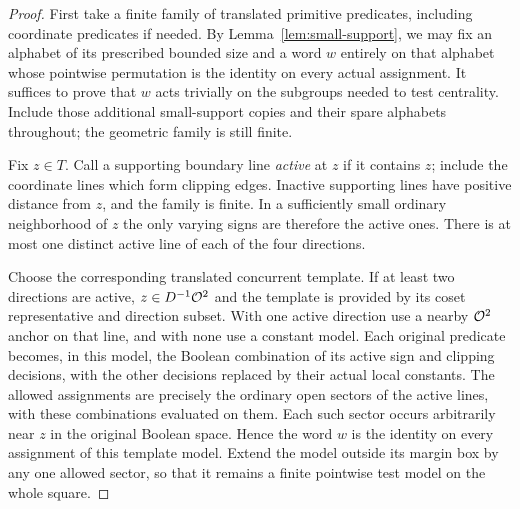 \begin{proof}
First take a finite family of translated primitive predicates,
including coordinate predicates if needed.  By
Lemma~\ref{lem:small-support}, we may fix an alphabet of its
prescribed bounded size and a word $w$ entirely on that alphabet
whose pointwise permutation is the identity on every actual
assignment.  It suffices to prove that $w$ acts trivially on
the subgroups needed to test centrality.  Include those
additional small-support copies and their spare alphabets
throughout; the geometric family is still finite.

Fix $z\in T$.  Call a supporting boundary line \emph{active}
at $z$ if it contains $z$; include the coordinate lines which
form clipping edges.  Inactive supporting lines have positive
distance from $z$, and the family is finite.  In a sufficiently
small ordinary neighborhood of $z$ the only varying signs are
therefore the active ones.  There is at most one distinct
active line of each of the four directions.

Choose the corresponding translated concurrent template.
If at least two directions are active, $z\in D^{-1}\mathcal O^2$
and the template is provided by its coset representative and
direction subset.  With one active direction use a nearby
$\mathcal O^2$ anchor on that line, and with none use a constant
model.  Each original predicate becomes, in this model, the
Boolean combination of its active sign and clipping decisions,
with the other decisions replaced by their actual local
constants.  The allowed assignments are precisely the
ordinary open sectors of the active lines, with these
combinations evaluated on them.  Each such sector occurs
arbitrarily near $z$ in the original Boolean space.  Hence
the word $w$ is the identity on every assignment of this
template model.  Extend the model outside its margin box
by any one allowed sector, so that it remains a finite
pointwise test model on the whole square.


\end{proof}

